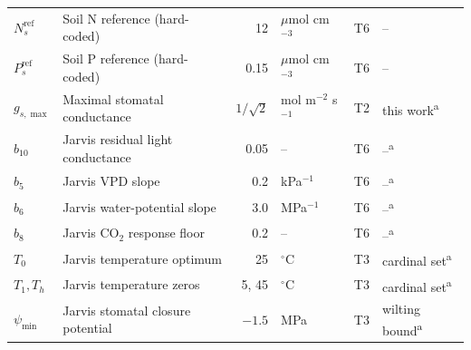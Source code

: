 \begin{table}[!htbp]
\begin{tabular}{@{}llrlll@{}}
$N_s^{\mathrm{ref}}$ & Soil N reference (hard-coded) & 12 & $\mu$mol cm$^{-3}$ & T6 & -- \\
$P_s^{\mathrm{ref}}$ & Soil P reference (hard-coded) & 0.15 & $\mu$mol cm$^{-3}$ & T6 & -- \\
$g_{s,\max}$ & Maximal stomatal conductance & $1/\sqrt{2}$ & mol m$^{-2}$ s$^{-1}$ & T2 & this work\textsuperscript{a} \\
$b_{10}$ & Jarvis residual light conductance & 0.05 & -- & T6 & --\textsuperscript{a} \\
$b_5$ & Jarvis VPD slope & 0.2 & kPa$^{-1}$ & T6 & --\textsuperscript{a} \\
$b_6$ & Jarvis water-potential slope & 3.0 & MPa$^{-1}$ & T6 & --\textsuperscript{a} \\
$b_8$ & Jarvis CO$_2$ response floor & 0.2 & -- & T6 & --\textsuperscript{a} \\
$T_0$ & Jarvis temperature optimum & 25 & $^\circ$C & T3 & cardinal set\textsuperscript{a} \\
$T_1,T_h$ & Jarvis temperature zeros & 5, 45 & $^\circ$C & T3 & cardinal set\textsuperscript{a} \\
$\psi_{\min}$ & Jarvis stomatal closure potential & $-1.5$ & MPa & T3 & wilting bound\textsuperscript{a} \\
\bottomrule
\end{tabular}
\end{table}

